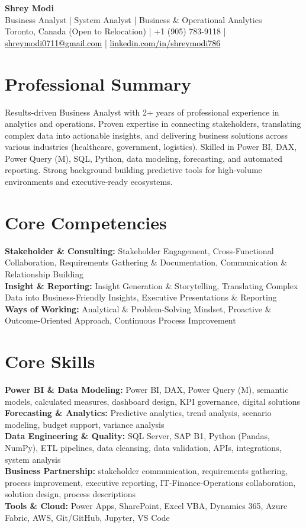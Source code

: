 \documentclass[10.5pt,letterpaper]{article}
\begin{document}
\begin{center}
  {\Huge \bfseries \color{accent} Shrey Modi}\\[0.3em]
  {\normalsize Business Analyst | System Analyst | Business \& Operational Analytics}\\[0.1em]
  {\small
    Toronto, Canada (Open to Relocation)
 | +1 (905) 783-9118 | \href{mailto:shreymodi0711@gmail.com}{\textcolor{black}{shreymodi0711@gmail.com}} | \href{https://linkedin.com/in/shreymodi786}{\textcolor{black}{linkedin.com/in/shreymodi786}}  }
\end{center}
\vspace{-12pt}

\section{Professional Summary}
\noindent Results-driven Business Analyst with 2+ years of professional experience in analytics and operations. Proven expertise in connecting stakeholders, translating complex data into actionable insights, and delivering business solutions across various industries (healthcare, government, logistics). Skilled in Power BI, DAX, Power Query (M), SQL, Python, data modeling, forecasting, and automated reporting. Strong background building predictive tools for high-volume environments and executive-ready ecosystems.


\section{Core Competencies}
\noindent
\textbf{Stakeholder \& Consulting:} Stakeholder Engagement, Cross-Functional Collaboration, Requirements Gathering \& Documentation, Communication \& Relationship Building\\\textbf{Insight \& Reporting:} Insight Generation \& Storytelling, Translating Complex Data into Business-Friendly Insights, Executive Presentations \& Reporting\\\textbf{Ways of Working:} Analytical \& Problem-Solving Mindset, Proactive \& Outcome-Oriented Approach, Continuous Process Improvement
\section{Core Skills}
\noindent
\textbf{Power BI \& Data Modeling:} Power BI, DAX, Power Query (M), semantic models, calculated measures, dashboard design, KPI governance, digital solutions\\\textbf{Forecasting \& Analytics:} Predictive analytics, trend analysis, scenario modeling, budget support, variance analysis\\\textbf{Data Engineering \& Quality:} SQL Server, SAP B1, Python (Pandas, NumPy), ETL pipelines, data cleansing, data validation, APIs, integrations, system analysis\\\textbf{Business Partnership:} stakeholder communication, requirements gathering, process improvement, executive reporting, IT-Finance-Operations collaboration, solution design, process descriptions\\\textbf{Tools \& Cloud:} Power Apps, SharePoint, Excel VBA, Dynamics 365, Azure Fabric, AWS, Git/GitHub, Jupyter, VS Code
\end{document}
